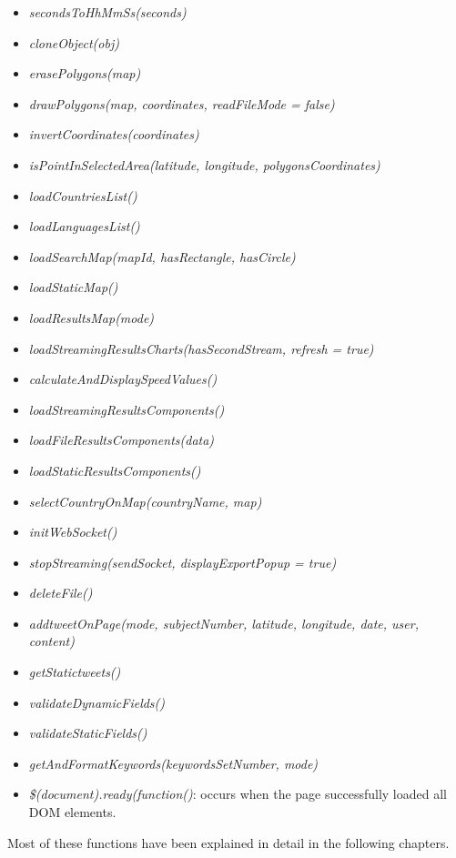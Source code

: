 \documentclass[a4paper,11pt]{report}
\begin{document}
\begin{itemize}
	\item \emph{secondsToHhMmSs(seconds)}
	\item \emph{cloneObject(obj)}\cite{elliotbonneville2011}
	\item \emph{erasePolygons(map)}
	\item \emph{drawPolygons(map, coordinates, readFileMode = false)}
	\item \emph{invertCoordinates(coordinates)}
	\item \emph{isPointInSelectedArea(latitude, longitude, polygonsCoordinates)}\cite{RandolphFranklin2016}
	\item \emph{loadCountriesList()}
	\item \emph{loadLanguagesList()}
	\item \emph{loadSearchMap(mapId, hasRectangle, hasCircle)}
	\item \emph{loadStaticMap()}
	\item \emph{loadResultsMap(mode)}
	\item \emph{loadStreamingResultsCharts(hasSecondStream, refresh = true)}
	\item \emph{calculateAndDisplaySpeedValues()}
	\item \emph{loadStreamingResultsComponents()}
	\item \emph{loadFileResultsComponents(data)}
	\item \emph{loadStaticResultsComponents()}
	\item \emph{selectCountryOnMap(countryName, map)}
	\item \emph{initWebSocket()}
	\item \emph{stopStreaming(sendSocket, displayExportPopup = true)}
	\item \emph{deleteFile()}
	\item \emph{addtweetOnPage(mode, subjectNumber, latitude, longitude, date, user, content)}
	\item \emph{getStatictweets()}
	\item \emph{validateDynamicFields()}
	\item \emph{validateStaticFields()}
	\item \emph{getAndFormatKeywords(keywordsSetNumber, mode)}
	\item \emph{\$(document).ready(function()}: occurs when the page successfully loaded all DOM elements.
\end{itemize}

Most of these functions have been explained in detail in the following chapters.
\bigskip
\end{document}
